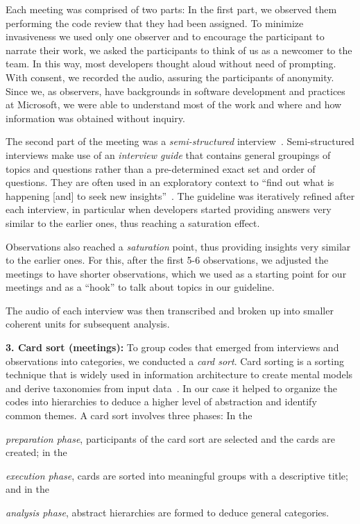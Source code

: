 Each meeting was comprised of two parts: In the first part, we observed them
performing the code review that they had been assigned. To minimize
invasiveness we used only one observer and to encourage the participant to
narrate their work, we asked the participants to think of us as a newcomer to
the team. In this way, most developers thought aloud without need of prompting.
With consent, we recorded the audio, assuring the participants of anonymity.
Since we, as observers, have backgrounds in software development and practices
at Microsoft, we were able to understand most of the work and where and how
information was obtained without inquiry. 

The second part of the meeting was a \emph{semi-structured} interview~\cite{taylor2010qualitative}. Semi-structured interviews make use of an \emph{interview guide} that
contains general groupings of topics and questions rather than a pre-determined
exact set and order of questions.  They are often used in an exploratory
context to ``find out what is happening [and] to seek new insights''~\cite{weiss1995learning}. 
The guideline was iteratively refined after each interview, in
particular when developers started providing answers very similar to the
earlier ones, thus reaching a saturation effect.

Observations also reached a \emph{saturation} point, thus providing insights very similar to the earlier ones. For this, after the first 5-6 observations, we adjusted the meetings to have shorter observations, which we used as a starting point for our meetings and as a ``hook'' to talk about topics in our guideline.

The audio of each interview was then transcribed and broken up into smaller
coherent units for subsequent analysis.

\textbf{3. Card sort (meetings):} To group codes that emerged from interviews and
observations into categories, we conducted a \emph{card sort}. Card sorting is a
sorting technique that is widely used in information architecture to create
mental models and derive taxonomies from input data~\cite{barker2005online}. In our case
it helped to organize the codes into hierarchies to deduce a higher level of
abstraction and identify common themes. A card sort involves three phases: In
the \begin{inparaenum}[(1)]
\item \emph{preparation phase}, participants of the card sort are selected and the
cards are created; in the 
\item \emph{execution phase}, cards are sorted into meaningful
groups with a descriptive title; and in the 
\item \emph{analysis phase}, abstract hierarchies are formed to deduce general categories.
\end{inparaenum}

